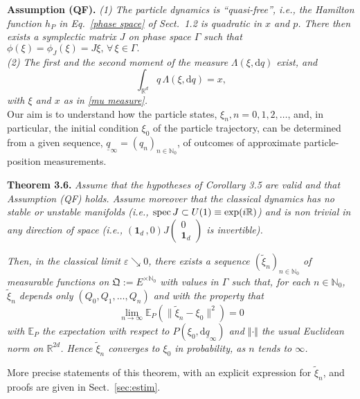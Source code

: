 \documentclass[12pt]{article}
\begin{document}
\vspace{0.2cm}\noindent
{\bf{Assumption (QF).}} \textit{(1) The particle dynamics is ``quasi-free'', i.e., the Hamilton function $h_P$ in 
Eq.~\eqref{phase space} of Sect.~1.2 is quadratic in $x$ and $p$. There then exists a symplectic matrix $J$ 
on phase space $\Gamma$ such that $\phi(\xi)=\phi_{J}(\xi)= J\xi,\, \forall\, \xi \in \Gamma.$} \\
\textit{(2) The first and the second moment of the measure} $\Lambda(\xi, \text{d}q)$ \textit{exist, and}
\begin{equation}\label{momen}
\int_{\mathbb{R}^{d}} q\, \Lambda(\xi, \text{d}q)= x, 
\end{equation}
\textit{with $\xi$ and $x$ as in \eqref{mu measure}.}\\

Our aim is to understand how
the particle states, $\xi_n, n=0,1,2, \dots$, and, in particular, the initial condition $\xi_0$ of the particle trajectory, 
can be determined from a given sequence, $\underline{q}_{\infty} =(q_n)_{n\in \mathbb{N}_0}$, of outcomes of approximate
particle-position measurements.

\vspace{0.2cm}\noindent
{\bf{Theorem 3.6.}} \textit{Assume that the hypotheses of Corollary 3.5 are valid and that Assumption (QF) holds. Assume moreover that the classical dynamics has no stable or unstable  manifolds (i.e., $\operatornamewithlimits{spec}J\subset U(1)\equiv \text{exp}(i \mathbb{R})$) and is non trivial in any direction of space (i.e., $(\mathbf{1}_d\,, 0)J\left(\substack{0\\\mathbf{1}_d}\right)$ is invertible).}

\textit{Then, in the classical limit $\varepsilon \searrow 0$, there exists a sequence $(\tilde \xi_n)_{n\in\mathbb N_0}$ 
of measurable functions on $\mathfrak{Q}:= E^{\times \mathbb{N}_0}$ with values in $\Gamma$ such that, for each $n\in \mathbb N_0$, $\tilde\xi_n$ depends only $(Q_0,Q_1,\dotsc,Q_n)$ and with the property that}
$$\lim_{n\to\infty}\mathbb E_{P}(\|\tilde\xi_n-\xi_0\|^2)=0$$
\textit{with $\mathbb E_P$ the expectation with respect to $P(\xi_0,\mathrm{d}\underline{q}_\infty)$ and 
$\Vert \cdot \Vert$ the usual Euclidean norm on $\mathbb{R}^{2d}$. Hence $\tilde \xi_n$ converges to 
$\xi_0$ in probability, as $n$ tends to $\infty$.}

\vspace{0.15cm}More precise statements of this theorem, with an explicit expression for $\tilde \xi_n$, and proofs are 
given in Sect.~\ref{sec:estim}.
\end{document}
